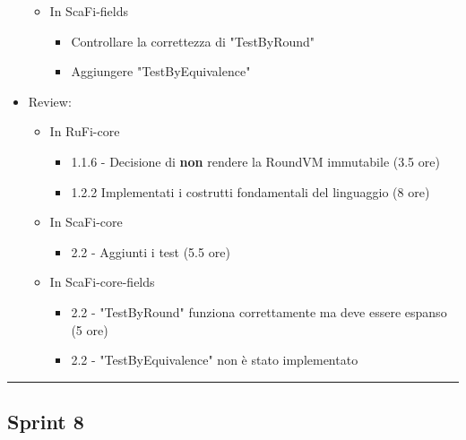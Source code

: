 \documentclass[12pt, a4paper]{article}
\begin{document}
\begin{itemize}
\begin{itemize}
              \item In ScaFi-fields
                    \begin{itemize}
                        \item Controllare la correttezza di "TestByRound"
                        \item Aggiungere "TestByEquivalence"
                    \end{itemize}
          \end{itemize}
    \item Review:
          \begin{itemize}
              \color{teal}
              \item In RuFi-core
                    \begin{itemize}
                        \item 1.1.6 - Decisione di \textbf{non} rendere la RoundVM immutabile (3.5 ore)
                        \item 1.2.2 Implementati i costrutti fondamentali del linguaggio (8 ore)
                    \end{itemize}
                    \color{cyan}
              \item In ScaFi-core
                    \begin{itemize}
                        \item 2.2 - Aggiunti i test (5.5 ore)
                    \end{itemize}
                    \color{cyan}
              \item In ScaFi-core-fields
                    \begin{itemize}
                        \item 2.2 - "TestByRound" funziona correttamente ma deve essere espanso (5 ore)
                        \item 2.2 - "TestByEquivalence" non è stato implementato
                    \end{itemize}
          \end{itemize}
\end{itemize}

\par\noindent\rule{\textwidth}{0.5pt}


\subsection*{Sprint 8}
\end{document}

